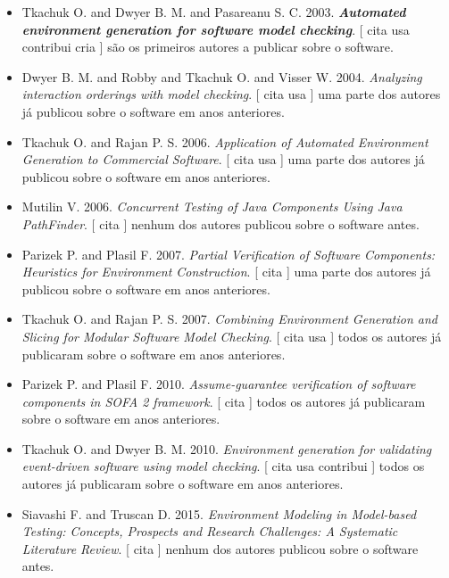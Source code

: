 \begin{itemize}
\item Tkachuk O. and Dwyer B. M. and Pasareanu S. C.
      2003.
        \textbf{\textit{ Automated environment generation for software model checking}}.
      [
          cita
          usa
          contribui
          cria
      ]
são os primeiros autores a publicar sobre o software.
\item Dwyer B. M. and Robby and Tkachuk O. and Visser W.
      2004.
        \textit{ Analyzing interaction orderings with model checking}.
      [
          cita
          usa
      ]
uma parte dos autores já publicou sobre o software em anos anteriores.
\item Tkachuk O. and Rajan P. S.
      2006.
        \textit{ Application of Automated Environment Generation to Commercial Software}.
      [
          cita
          usa
      ]
uma parte dos autores já publicou sobre o software em anos anteriores.
\item Mutilin V.
      2006.
        \textit{ Concurrent Testing of Java Components Using Java PathFinder}.
      [
          cita
      ]
nenhum dos autores publicou sobre o software antes.
\item Parizek P. and Plasil F.
      2007.
        \textit{ Partial Verification of Software Components: Heuristics for Environment Construction}.
      [
          cita
      ]
uma parte dos autores já publicou sobre o software em anos anteriores.
\item Tkachuk O. and Rajan P. S.
      2007.
        \textit{ Combining Environment Generation and Slicing for Modular Software Model Checking}.
      [
          cita
          usa
      ]
todos os autores já publicaram sobre o software em anos anteriores.
\item Parizek P. and Plasil F.
      2010.
        \textit{ Assume-guarantee verification of software components in SOFA 2 framework}.
      [
          cita
      ]
todos os autores já publicaram sobre o software em anos anteriores.
\item Tkachuk O. and Dwyer B. M.
      2010.
        \textit{ Environment generation for validating event-driven software using model checking}.
      [
          cita
          usa
          contribui
      ]
todos os autores já publicaram sobre o software em anos anteriores.
\item Siavashi F. and Truscan D.
      2015.
        \textit{ Environment Modeling in Model-based Testing: Concepts, Prospects and Research Challenges: A Systematic Literature Review}.
      [
          cita
      ]
nenhum dos autores publicou sobre o software antes.
\end{itemize}

